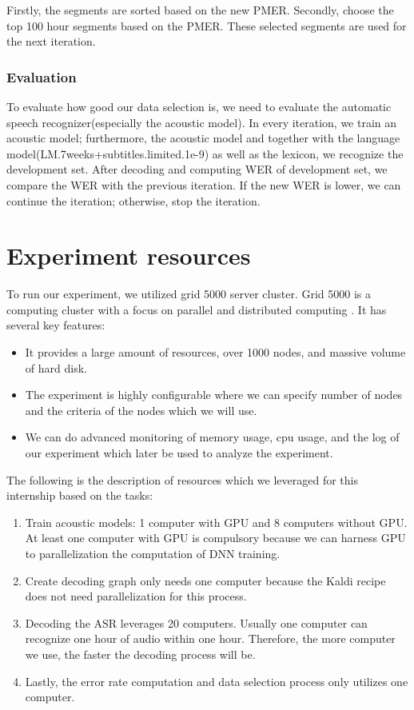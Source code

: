 Firstly, the segments are sorted based on the new PMER. Secondly, choose the top 100 hour segments based on the PMER. These selected segments are used for the next iteration. 

\subsubsection{Evaluation}
To evaluate how good our data selection is, we need to evaluate the automatic speech recognizer(especially the acoustic model). In every iteration, we train an acoustic model; furthermore, the acoustic model and together with the language model(LM.7weeks+subtitles.limited.1e-9) as well as the lexicon, we recognize the development set. After decoding and computing WER of development set, we compare the WER with the previous iteration. If the new WER is lower, we can continue the iteration; otherwise, stop the iteration. 
 

\section{Experiment resources}
To run our experiment, we utilized grid 5000 server cluster. Grid 5000 is a computing cluster with a focus on parallel and distributed computing \cite{Grid5000}. It has several key features:
\begin{itemize}
\item It provides a large amount of resources, over 1000 nodes, and massive volume of hard disk.
\item The experiment is highly configurable where we can specify number of nodes and the criteria of the nodes which we will use.
\item We can do advanced monitoring of memory usage, cpu usage, and the log of our experiment which later be used to analyze the experiment.
\end{itemize}

The following is the description of resources which we leveraged for this internship based on the tasks:
\begin{enumerate}
\item Train acoustic models: 1 computer with GPU and 8 computers without GPU. At least one computer with GPU is compulsory because we can harness GPU to parallelization the computation of DNN training. 
\item Create decoding graph only needs one computer because the Kaldi recipe does not need parallelization for this process.
\item Decoding the ASR leverages 20 computers. Usually one computer can recognize one hour of audio within one hour. Therefore, the more computer we use, the faster the decoding process will be. 
\item Lastly, the error rate computation and data selection process only utilizes one computer. 
\end{enumerate}


